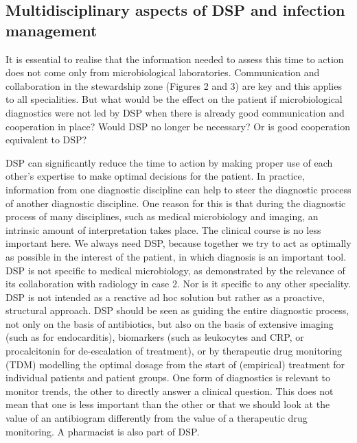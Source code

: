 \documentclass[
]{book}
\begin{document}
\hypertarget{multidisciplinary-aspects-of-dsp-and-infection-management}{%
\subsection{Multidisciplinary aspects of DSP and infection management}\label{multidisciplinary-aspects-of-dsp-and-infection-management}}

It is essential to realise that the information needed to assess this time to action does not come only from microbiological laboratories. Communication and collaboration in the stewardship zone (Figures 2 and 3) are key and this applies to all specialities. But what would be the effect on the patient if microbiological diagnostics were not led by DSP when there is already good communication and cooperation in place? Would DSP no longer be necessary? Or is good cooperation equivalent to DSP?

DSP can significantly reduce the time to action by making proper use of each other's expertise to make optimal decisions for the patient. In practice, information from one diagnostic discipline can help to steer the diagnostic process of another diagnostic discipline. One reason for this is that during the diagnostic process of many disciplines, such as medical microbiology and imaging, an intrinsic amount of interpretation takes place. The clinical course is no less important here. We always need DSP, because together we try to act as optimally as possible in the interest of the patient, in which diagnosis is an important tool. DSP is not specific to medical microbiology, as demonstrated by the relevance of its collaboration with radiology in case 2. Nor is it specific to any other speciality. DSP is not intended as a reactive ad hoc solution but rather as a proactive, structural approach. DSP should be seen as guiding the entire diagnostic process, not only on the basis of antibiotics, but also on the basis of extensive imaging (such as for endocarditis), biomarkers (such as leukocytes and CRP, or procalcitonin for de-escalation of treatment), or by therapeutic drug monitoring (TDM) modelling the optimal dosage from the start of (empirical) treatment for individual patients and patient groups. One form of diagnostics is relevant to monitor trends, the other to directly answer a clinical question. This does not mean that one is less important than the other or that we should look at the value of an antibiogram differently from the value of a therapeutic drug monitoring. A pharmacist is also part of DSP.
\end{document}
